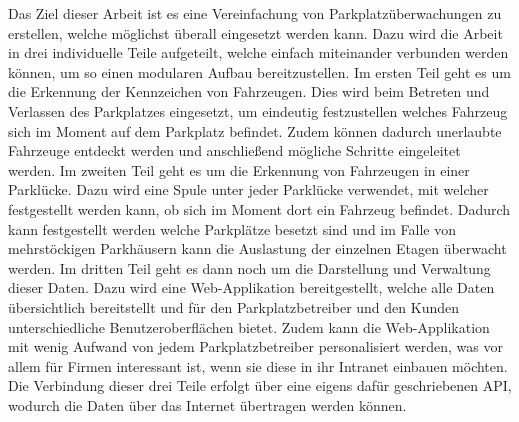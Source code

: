 Das Ziel dieser Arbeit ist es eine Vereinfachung von Parkplatzüberwachungen zu erstellen, welche möglichst überall eingesetzt werden kann.
Dazu wird die Arbeit in drei individuelle Teile aufgeteilt, welche einfach miteinander verbunden werden können, um so einen modularen Aufbau bereitzustellen. 
Im ersten Teil geht es um die Erkennung der Kennzeichen von Fahrzeugen. Dies wird beim Betreten und Verlassen des Parkplatzes eingesetzt, um 
eindeutig festzustellen welches Fahrzeug sich im Moment auf dem Parkplatz befindet. Zudem können dadurch unerlaubte Fahrzeuge entdeckt werden 
und anschließend mögliche Schritte eingeleitet werden. Im zweiten Teil geht es um die Erkennung von Fahrzeugen in einer Parklücke. Dazu wird 
eine Spule unter jeder Parklücke verwendet, mit welcher festgestellt werden kann, ob sich im Moment dort ein Fahrzeug befindet. Dadurch kann 
festgestellt werden welche Parkplätze besetzt sind und im Falle von mehrstöckigen Parkhäusern kann die Auslastung der einzelnen Etagen überwacht 
werden. Im dritten Teil geht es dann noch um die Darstellung und Verwaltung dieser Daten. Dazu wird eine Web-Applikation bereitgestellt, welche 
alle Daten übersichtlich bereitstellt und für den Parkplatzbetreiber und den Kunden unterschiedliche Benutzeroberflächen bietet. Zudem kann die 
Web-Applikation mit wenig Aufwand von jedem Parkplatzbetreiber personalisiert werden, was vor allem für Firmen interessant ist, wenn sie diese 
in ihr Intranet einbauen möchten. Die Verbindung dieser drei Teile erfolgt über eine eigens dafür geschriebenen API, wodurch die Daten über das Internet übertragen werden können.